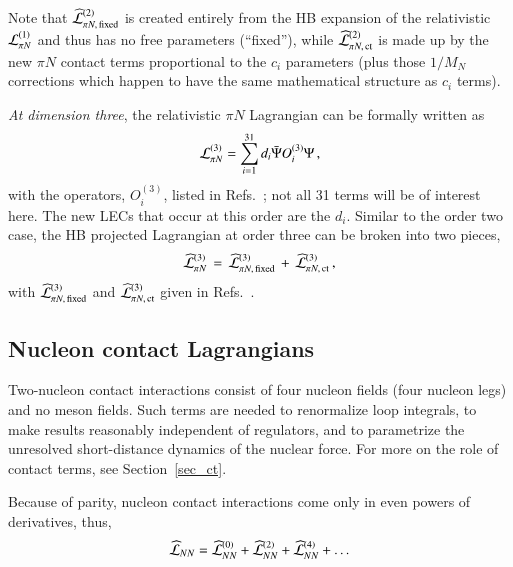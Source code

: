 \documentclass[sort&compress,preprint,3p]{elsarticle}
\begin{document}
Note that 
$\widehat{\cal L}^{(2)}_{\pi N, \, \rm fixed}$  
is created entirely from the HB expansion of the relativistic
${\cal L}^{(1)}_{\pi N}$ and thus has no free parameters (``fixed''),
while 
$\widehat{\cal L}^{(2)}_{\pi N, \, \rm ct}$
is made up by the new $\pi N$ contact terms proportional to the
$c_i$ parameters (plus those $1/M_N$ corrections
which happen to have the same mathematical structure as
$c_i$ terms).

{\it At dimension three},
the relativistic $\pi N$ Lagrangian can be formally written as
\begin{equation}
{\cal L}^{(3)}_{\pi N} 
= \sum_{i=1}^{31} d_i \bar{\Psi} O^{(3)}_i \Psi \, ,
\label{eq_L3rel}
\end{equation}
with the operators, $O^{(3)}_i$, listed in Refs.~\cite{Fet00,FMS98}; 
not all 31 terms will be of interest here.
The new LECs that occur at this order are the $d_i$.
Similar to the order two case,
the HB projected Lagrangian at order three can be broken into two pieces,
\begin{equation}
\widehat{\cal L}^{(3)}_{\pi N} \, = \,
\widehat{\cal L}^{(3)}_{\pi N, \, \rm fixed} \, + \,
\widehat{\cal L}^{(3)}_{\pi N, \, \rm ct} \, ,
\label{eq_L3}
\end{equation}
with
$\widehat{\cal L}^{(3)}_{\pi N, \, \rm fixed}$
and
$\widehat{\cal L}^{(3)}_{\pi N, \, \rm ct}$
given in Refs.~\cite{Fet00,FMS98}.


\subsection{Nucleon contact Lagrangians \label{sec_Lct}}

Two-nucleon contact interactions consist of four nucleon
fields (four nucleon legs) and no meson fields.
Such terms are needed to renormalize
loop integrals, to make results reasonably independent
of regulators, and to parametrize the 
unresolved short-distance dynamics of the nuclear
force. For more on the role of contact terms,
see Section~\ref{sec_ct}.

Because of parity, nucleon contact interactions come only
in even powers of derivatives, thus,
\begin{equation}
\label{eq_LNN}
\widehat{\cal L}_{NN} =
\widehat{\cal L}^{(0)}_{NN} +
\widehat{\cal L}^{(2)}_{NN} +
\widehat{\cal L}^{(4)}_{NN} + \ldots
\end{equation}
\end{document}
